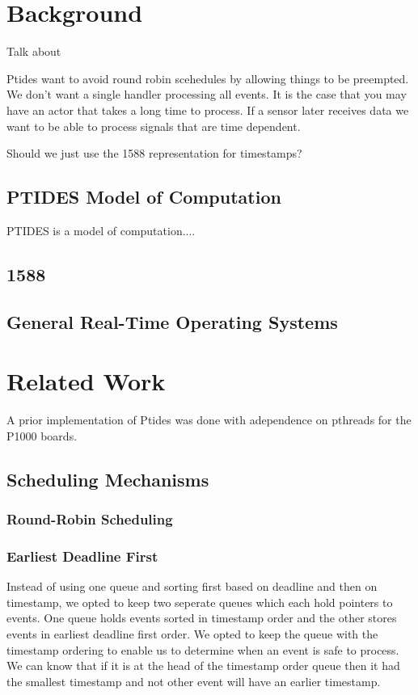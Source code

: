 \documentclass{sig-alternate}
\begin{document}
\section{Background}
Talk about 

Ptides want to avoid round robin scehedules by allowing things to be preempted. We don't want a single handler processing all events. It is the case that you may have an actor that takes a long time to process. If a sensor later receives data we want to be able to process signals that are time dependent.

Should we just use the 1588 representation for timestamps?

\subsection{PTIDES Model of Computation}
PTIDES is a \cite{ptidesTechReport} model of computation....

\subsection{1588}
\subsection{General Real-Time Operating Systems}



\section{Related Work}
A prior implementation of Ptides was done with adependence on pthreads for the P1000 boards.

\subsection{Scheduling Mechanisms}
\subsubsection{Round-Robin Scheduling}
\subsubsection{Earliest Deadline First}
Instead of using one queue and sorting first based on deadline and then on timestamp, we opted to keep two seperate queues which each hold pointers to events. One queue holds events sorted in timestamp order and the other stores events in earliest deadline first order. We opted to keep the queue with the timestamp ordering to enable us to determine when an event is safe to process. We can know that if it is at the head of the timestamp order queue then it had the smallest timestamp and not other event will have an earlier timestamp.
\end{document}
